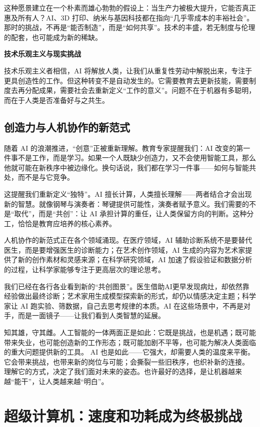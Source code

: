 这种愿景建立在一个朴素而雄心勃勃的假设上：当生产力被极大提升，它能否真正惠及所有人？AI、3D 打印、纳米与基因科技都在指向“几乎零成本的丰裕社会”。那时的挑战，不再是“能否制造”，而是“如何共享”。技术的丰盛，若无制度与伦理的配套，也可能成为新的稀缺。

{\bf 技术乐观主义与现实挑战}

技术乐观主义者相信，AI 将解放人类，让我们从重复性劳动中解脱出来，专注于更具创造性的工作。但这种转变不是自动发生的。它需要教育去更新技能，需要制度去再分配成果，需要社会去重新定义“工作的意义”。问题不在于机器有多聪明，而在于人类是否准备好与之共生。

\subsection{创造力与人机协作的新范式}

随着 AI 的浪潮推进，“创意”正被重新理解。教育专家提醒我们：AI 改变的第一件事不是工作，而是学习。如果一个人既缺少创造力，又不会使用智能工具，那么他就可能在新秩序中被边缘化。换句话说，我们都在学习一件事——如何与智能共处，而不是与它竞争。

这提醒我们重新定义“独特”。AI 擅长计算，人类擅长理解——两者结合才会出现新的智慧。就像钢琴与演奏者：琴键提供可能性，演奏者赋予意义。我们需要的不是“取代”，而是“共创”：让 AI 承担计算的重任，让人类保留方向的判断。这种分工，恰恰是教育应培养的核心素养。

人机协作的新范式正在各个领域涌现。在医疗领域，AI 辅助诊断系统不是要替代医生，而是要增强医生的诊断能力；在艺术创作领域，AI 生成的内容为艺术家提供了新的创作素材和灵感来源；在科学研究领域，AI 加速了假设验证和数据分析的过程，让科学家能够专注于更高层次的理论思考。

我们已经在各行各业看到新的“共创图景”。医生借助AI更早发现病灶，却依然靠经验做出最终诊断；艺术家用生成模型探索新的形式，却仍以情感决定主题；科学家让 AI 跑实验、筛数据，自己去思考规律的本质。AI 在这些场景中，不再是对手，而是一面镜子——让我们看到人类智慧的延展。

知其雄，守其雌。人工智能的一体两面正是如此：它既是挑战，也是机遇；既可能带来失业，也可能创造新的工作形态；既可能加剧不平等，也可能为解决人类面临的重大问题提供新的工具。
AI 也是如此——它强大，却需要人类的温度来平衡。它会带来挑战，也带来新的岗位与可能；会撕裂一些旧秩序，也织补新的连接。
理解它的方式，决定了我们面对未来的姿态。也许最好的选择，是让机器越来越“能干”，让人类越来越“明白”。

\section{超级计算机：速度和功耗成为终极挑战}

